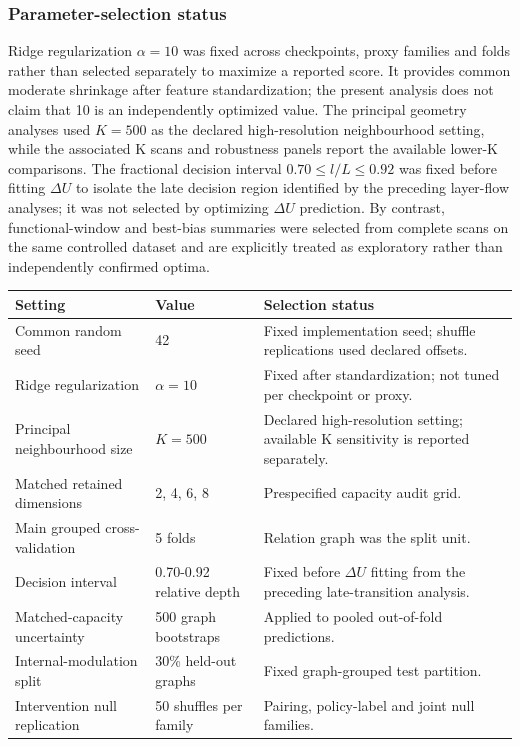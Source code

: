 \documentclass[11pt]{article}
\begin{document}
\subsubsection*{Parameter-selection status}
Ridge regularization \(\alpha=10\) was fixed across checkpoints, proxy families and folds rather than selected separately to maximize a reported score. It provides common moderate shrinkage after feature standardization; the present analysis does not claim that 10 is an independently optimized value. The principal geometry analyses used \(K=500\) as the declared high-resolution neighbourhood setting, while the associated K scans and robustness panels report the available lower-K comparisons. The fractional decision interval \(0.70\leq l/L\leq0.92\) was fixed before fitting \(\Delta U\) to isolate the late decision region identified by the preceding layer-flow analyses; it was not selected by optimizing \(\Delta U\) prediction. By contrast, functional-window and best-bias summaries were selected from complete scans on the same controlled dataset and are explicitly treated as exploratory rather than independently confirmed optima.

\begin{table}[H]
\centering\scriptsize\sloppy
\begin{tabularx}{\textwidth}{@{}XXX@{}}
\toprule
Setting & Value & Selection status \\
\midrule
Common random seed & 42 & Fixed implementation seed; shuffle replications used declared offsets. \\
Ridge regularization & \(\alpha=10\) & Fixed after standardization; not tuned per checkpoint or proxy. \\
Principal neighbourhood size & \(K=500\) & Declared high-resolution setting; available K sensitivity is reported separately. \\
Matched retained dimensions & 2, 4, 6, 8 & Prespecified capacity audit grid. \\
Main grouped cross-validation & 5 folds & Relation graph was the split unit. \\
Decision interval & 0.70-0.92 relative depth & Fixed before \(\Delta U\) fitting from the preceding late-transition analysis. \\
Matched-capacity uncertainty & 500 graph bootstraps & Applied to pooled out-of-fold predictions. \\
Internal-modulation split & 30\% held-out graphs & Fixed graph-grouped test partition. \\
Intervention null replication & 50 shuffles per family & Pairing, policy-label and joint null families. \\
\bottomrule
\end{tabularx}
\end{table}
\end{document}

